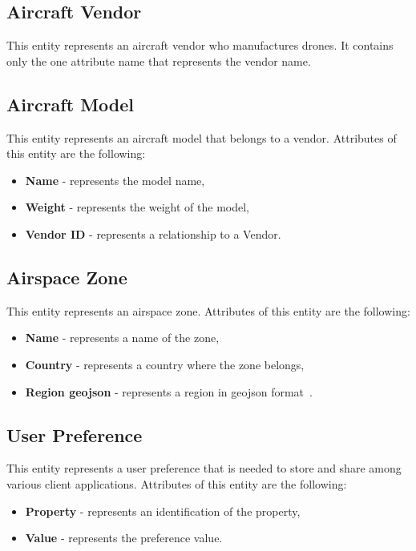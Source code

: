 \subsection{Aircraft Vendor}\label{subsec:aircraft-vendor}
This entity represents an aircraft vendor who manufactures drones.
It contains only the one attribute name that represents the vendor name.

\subsection{Aircraft Model}\label{subsec:aircraft-model}
This entity represents an aircraft model that belongs to a vendor.
Attributes of this entity are the following:
\begin{itemize}
    \item \textbf{Name} - represents the model name,
    \item \textbf{Weight} - represents the weight of the model,
    \item \textbf{Vendor ID} - represents a relationship to a Vendor.
\end{itemize}

\subsection{Airspace Zone}\label{subsec:airspace-zone}
This entity represents an airspace zone.
Attributes of this entity are the following:
\begin{itemize}
    \item \textbf{Name} - represents a name of the zone,
    \item \textbf{Country} - represents a country where the zone belongs,
    \item \textbf{Region \acrshort{geojson}} - represents a region in \acrshort{geojson} format~\cite{geoJson}.
\end{itemize}

\subsection{User Preference}\label{subsec:user-preference}
This entity represents a user preference that is needed to store and share among various client applications.
Attributes of this entity are the following:
\begin{itemize}
    \item \textbf{Property} - represents an identification of the property,
    \item \textbf{Value} - represents the preference value.
\end{itemize}

